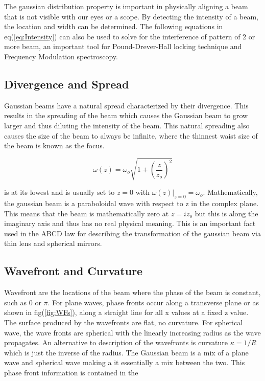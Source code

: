 \documentclass[a4paper]{book}
\begin{document}
			The gaussian distribution property is important in physically aligning a beam that is not visible with our eyes or a scope. By detecting the intensity of a beam, the location and width can be determined. The following equations in eq(\ref{eq:Intensity}) can also be used to solve for the interference of pattern of 2 or more beam, an important tool for Pound-Drever-Hall locking technique and Frequency Modulation spectroscopy.
			
		\subsection{Divergence and Spread}
			\label{subsec:Divergence}
			Gaussian beams have a natural spread characterized by their divergence.
			This results in the spreading of the beam which causes the Gaussian beam to grow larger and thus diluting the intensity of the beam.
			This natural spreading also causes the size of the beam to always be infinite, where the thinnest waist size of the beam is known as the focus. 
			
			\begin{equation}
				\omega (z)=\omega_o \sqrt{1+\left(\dfrac{z}{z_o}\right)^2}
			\end{equation}
			
			is at its lowest and is usually set to $z=0$ with $\omega(z)|_{z=0}=\omega_o$.
			Mathematically, the gaussian beam is a paraboloidal wave with respect to z in the complex plane. 
			This means that the beam is mathematically zero at $z=i z_o$ but this is along the imaginary axis and thus has no real physical meaning. 
			This is an important fact used in the ABCD law for describing the transformation of the gaussian beam via thin lens and spherical mirrors.
			
		\subsection{Wavefront and Curvature}
			\label{subsec:wavefront}
			Wavefront are the locations of the beam where the phase of the beam is constant, such as 0 or $\pi$. For plane waves, phase fronts occur along a transverse plane or as shown in fig(\ref{fig:WFs}), along a straight line for all x values at a fixed z value. The surface produced by the wavefronts are flat, no curvature. For spherical wave, the wave fronts are spherical with the linearly increasing radius as the wave propagates. An alternative to description of the wavefronts is curvature $\kappa = 1/R$ which is just the inverse of the radius.
			The Gaussian beam is a mix of a plane wave and spherical wave making a it essentially a mix between the two. This phase front information is contained in the 
							
\end{document}
